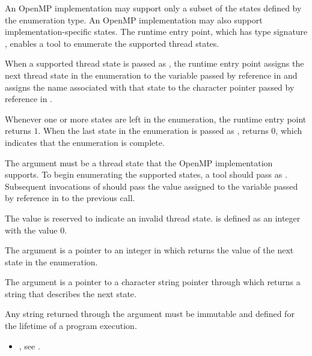 \descr
An OpenMP implementation may support only a subset of the states defined by
the  enumeration type. An OpenMP implementation may also
support implementation-specific states. The 
runtime entry point, which has type signature , 
 enables a tool to enumerate the supported thread states.

When a supported thread state is passed as , the runtime 
entry point assigns the next thread state in the enumeration to the variable 
passed by reference in  and assigns the name associated with 
that state to the character pointer passed by reference in .

Whenever one or more states are left in the enumeration, the 
 runtime entry point returns $1$. When 
the last state in the enumeration is passed as , 
 returns $0$, which indicates that the 
enumeration is complete.

\argdesc
The  argument must be a thread state that the OpenMP 
implementation supports. To begin enumerating the supported states, a tool 
should pass  as . Subsequent
invocations of  should pass the value assigned 
to the variable passed by reference in  to the previous call.

The value  is reserved to indicate an invalid thread 
state.  is defined as an integer with the value 0.

The  argument is a pointer to an integer in which 
 returns the value of the next state in the enumeration.

The  argument is a pointer to a character string 
pointer through which  returns a string 
that describes the next state.

\constraints
Any string returned through the  argument must be 
immutable and defined for the lifetime of a program execution.

\crossreferences
\begin{itemize}
\item {}, see .
\end{itemize}



